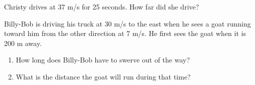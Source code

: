 \documentclass[12pt]{examdesign}
\begin{document}
\begin{shortanswer}[title={Free Response},
	rearrange=no]
\begin{question}
Christy drives at 37 m/s for 25 seconds.  How far did she drive?
\vspace{1in} 

\end{question}

\begin{question}
Billy-Bob is driving his truck at 30 m/s to the east when he sees a goat running toward him from the other direction at 7 m/s.  He first sees the goat when it is 200 m away.
\begin{enumerate}
	\item How long does Billy-Bob have to swerve out of the way?

\vspace{1in}
\item What is the distance the goat will run during that time?


\end{enumerate}
	
\end{question}



	\end{shortanswer}
\end{document}
